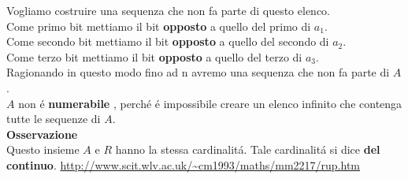 \documentclass[11pt]{article}
\begin{document}
            Vogliamo costruire una sequenza che non fa parte di questo elenco. \\
            Come primo bit mettiamo il bit \textbf{opposto} a quello del primo di $a_{1}$.\\
            Come secondo bit mettiamo il bit \textbf{opposto} a quello del secondo di $a_{2}$.\\
            Come terzo bit mettiamo il bit \textbf{opposto} a quello del terzo di $a_{3}$.\\
            Ragionando in questo modo fino ad n avremo una sequenza che non fa parte di $A$.
            \\$A$ non \'e \textbf{numerabile} , perch\'e \'e impossibile creare un elenco infinito che contenga tutte le sequenze di $A$.\\
            \textbf{Osservazione}\\ 
            Questo insieme $A$ e $R$ hanno la stessa cardinalit\'a. Tale cardinalit\'a si dice \textbf{del continuo}. \url{http://www.scit.wlv.ac.uk/~cm1993/maths/mm2217/rup.htm}
             
            
            
    
    
    
        
\end{document}
